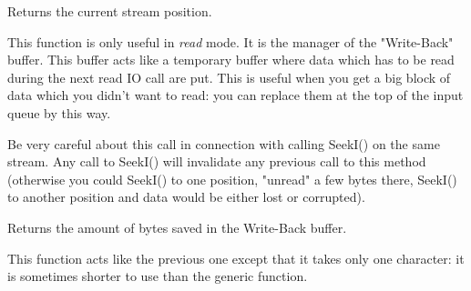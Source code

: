\label{wxinputstreamtelli}


Returns the current stream position.

\label{wxinputstreamungetch}


This function is only useful in {\it read} mode. It is the manager of the "Write-Back"
buffer. This buffer acts like a temporary buffer where data which has to be
read during the next read IO call are put. This is useful when you get a big
block of data which you didn't want to read: you can replace them at the top
of the input queue by this way.

Be very careful about this call in connection with calling SeekI() on the same
stream. Any call to SeekI() will invalidate any previous call to this method
(otherwise you could SeekI() to one position, "unread" a few bytes there, SeekI()
to another position and data would be either lost or corrupted).


Returns the amount of bytes saved in the Write-Back buffer.


This function acts like the previous one except that it takes only one
character: it is sometimes shorter to use than the generic function.

